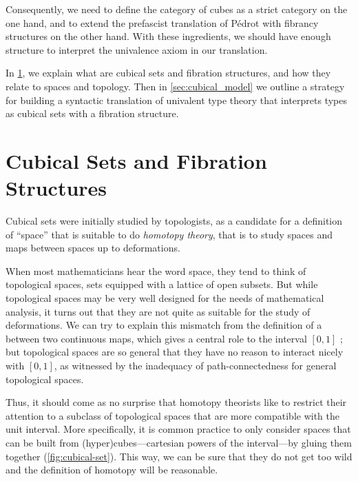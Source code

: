 Consequently, we need to define the category of cubes as a strict category on
the one hand, and to extend the prefascist translation of Pédrot with fibrancy 
structures on the other hand.   
% 
With these ingredients, we should have enough structure to interpret the 
univalence axiom in our translation.

In \cref{sec:cubical_sets}, we explain what are cubical sets and fibration 
structures, and how they relate to spaces and topology. 
% 
Then in \cref{sec:cubical_model} we outline a strategy for building a syntactic 
translation of univalent type theory that interprets types as cubical sets with 
a fibration structure.

\section{Cubical Sets and Fibration Structures}
\label{sec:cubical_sets}

Cubical sets were initially studied by topologists, as a candidate for a 
definition of ``space'' that is suitable to do \emph{homotopy theory}, that is 
to study spaces and maps between spaces up to deformations.

When most mathematicians hear the word space, they tend to think of topological
spaces, \ie sets equipped with a lattice of open subsets. 
% 
But while topological spaces may be very well designed for the needs of 
mathematical analysis, it turns out that they are not quite as suitable for 
the study of deformations. 
% 
We can try to explain this mismatch from the definition of a 
 between two continuous maps, 
which gives a central role to the interval \( [0, 1] \) ; but topological 
spaces are so general that they have no reason to interact nicely with \( [0, 1] \),
as witnessed by the inadequacy of path-connectedness for general topological 
spaces.

Thus, it should come as no surprise that homotopy theorists like to restrict their 
attention to a subclass of topological spaces that are more compatible with
the unit interval. 
More specifically, it is common practice to only consider spaces that can be 
built from (hyper)cubes---cartesian powers of the interval---by gluing them together 
(\cref{fig:cubical-set}). This way, we can be sure that they do not 
get too wild and the definition of homotopy will be reasonable.

